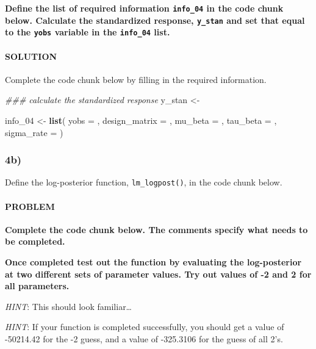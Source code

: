 \documentclass[
]{article}
\newenvironment{Shaded}{\begin{snugshade}}{\end{snugshade}}
\newcommand{\CommentTok}[1]{\textcolor[rgb]{0.56,0.35,0.01}{\textit{#1}}}
\newcommand{\DataTypeTok}[1]{\textcolor[rgb]{0.13,0.29,0.53}{#1}}
\newcommand{\DecValTok}[1]{\textcolor[rgb]{0.00,0.00,0.81}{#1}}
\newcommand{\KeywordTok}[1]{\textcolor[rgb]{0.13,0.29,0.53}{\textbf{#1}}}
\newcommand{\NormalTok}[1]{#1}
\newcommand{\StringTok}[1]{\textcolor[rgb]{0.31,0.60,0.02}{#1}}
\begin{document}
\textbf{Define the list of required information \texttt{info\_04} in the
code chunk below. Calculate the standardized response, \texttt{y\_stan}
and set that equal to the \texttt{yobs} variable in the
\texttt{info\_04} list.}

\hypertarget{solution-18}{%
\paragraph{SOLUTION}\label{solution-18}}

Complete the code chunk below by filling in the required information.

\begin{Shaded}
\begin{Highlighting}[]
\CommentTok{### calculate the standardized response}
\NormalTok{y_stan <-}\StringTok{ }

\NormalTok{info_}\DecValTok{04}\NormalTok{ <-}\StringTok{ }\KeywordTok{list}\NormalTok{(}
  \DataTypeTok{yobs =}\NormalTok{ ,}
  \DataTypeTok{design_matrix =}\NormalTok{ ,}
  \DataTypeTok{mu_beta =}\NormalTok{ ,}
  \DataTypeTok{tau_beta =}\NormalTok{ ,}
  \DataTypeTok{sigma_rate =} 
\NormalTok{)}
\end{Highlighting}
\end{Shaded}

\hypertarget{b-3}{%
\subsubsection{4b)}\label{b-3}}

Define the log-posterior function, \texttt{lm\_logpost()}, in the code
chunk below.

\hypertarget{problem-19}{%
\paragraph{PROBLEM}\label{problem-19}}

\textbf{Complete the code chunk below. The comments specify what needs
to be completed.}

\textbf{Once completed test out the function by evaluating the
log-posterior at two different sets of parameter values. Try out values
of -2 and 2 for all parameters.}

\emph{HINT}: This should look familiar\ldots{}

\emph{HINT}: If your function is completed successfully, you should get
a value of -50214.42 for the -2 guess, and a value of -325.3106 for the
guess of all 2's.
\end{document}
